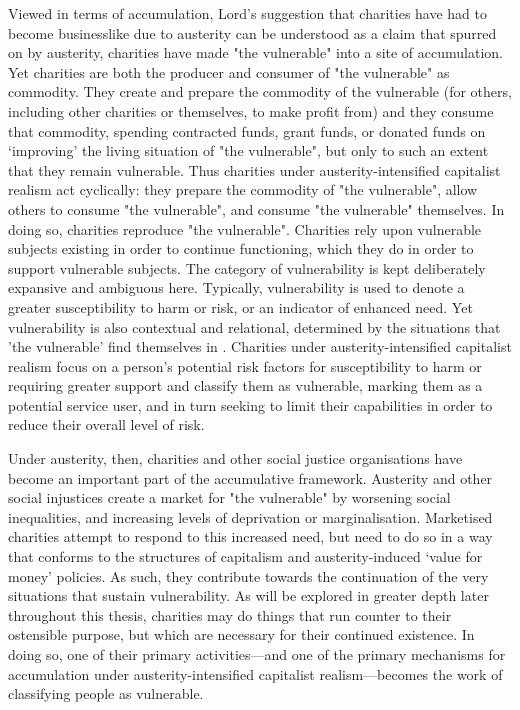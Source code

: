 Viewed in terms of accumulation, Lord's suggestion that charities have had to become businesslike due to austerity can be understood as a claim that spurred on by austerity, charities have made "the vulnerable" into a site of accumulation. Yet charities are both the producer and consumer of "the vulnerable" as commodity. They create and prepare the commodity of the vulnerable (for others, including other charities or themselves, to make profit from) and they consume that commodity, spending contracted funds, grant funds, or donated funds on `improving' the living situation of "the vulnerable", but only to such an extent that they remain vulnerable. Thus charities under austerity-intensified capitalist realism act cyclically: they prepare the commodity of "the vulnerable", allow others to consume "the vulnerable", and consume "the vulnerable" themselves. In doing so, charities reproduce "the vulnerable". Charities rely upon vulnerable subjects existing in order to continue functioning, which they do in order to support vulnerable subjects. The category of vulnerability is kept deliberately expansive and ambiguous here. Typically, vulnerability is used to denote a greater susceptibility to harm or risk, or an indicator of enhanced need. Yet vulnerability is also contextual and relational, determined by the situations that 'the vulnerable' find themselves in \citep{aldridge_working_2014}. Charities under austerity-intensified capitalist realism focus on a person's potential risk factors for susceptibility to harm or requiring greater support and classify them as vulnerable, marking them as a potential service user, and in turn seeking to limit their capabilities in order to reduce their overall level of risk. 

Under austerity, then, charities and other social justice organisations have become an important part of the accumulative framework. Austerity and other social injustices create a market for "the vulnerable" by worsening social inequalities, and increasing levels of deprivation or marginalisation. Marketised charities attempt to respond to this increased need, but need to do so in a way that conforms to the structures of capitalism and austerity-induced `value for money' policies. As such, they contribute towards the continuation of the very situations that sustain vulnerability. As will be explored in greater depth later throughout this thesis, charities may do things that run counter to their ostensible purpose, but which are necessary for their continued existence. In doing so, one of their primary activities—and one of the primary mechanisms for accumulation under austerity-intensified capitalist realism—becomes the work of classifying people as vulnerable.

